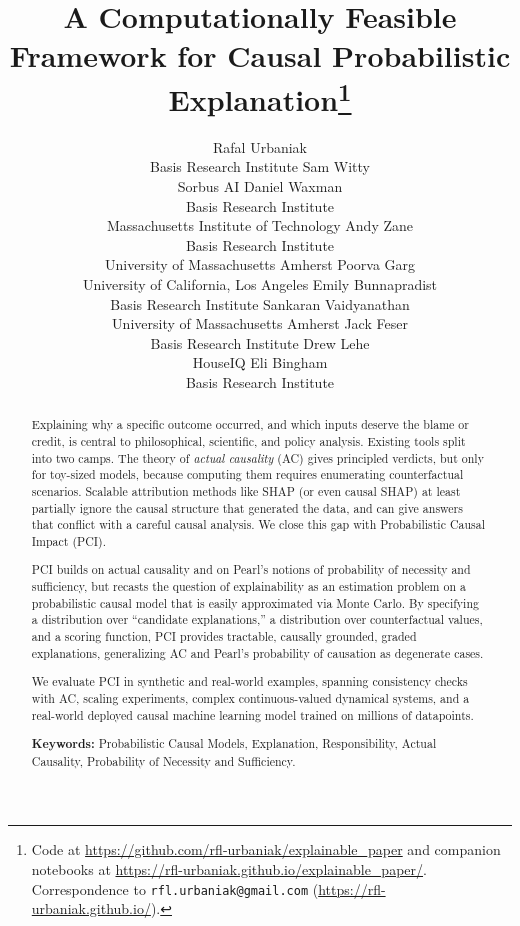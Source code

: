 \documentclass{article}
\title{A Computationally Feasible Framework for Causal Probabilistic Explanation\thanks{\raggedright Code at \url{https://github.com/rfl-urbaniak/explainable_paper} and companion notebooks at \url{https://rfl-urbaniak.github.io/explainable_paper/}. Correspondence to \texttt{rfl.urbaniak@gmail.com} (\url{https://rfl-urbaniak.github.io/}).}}
\author{%
  Rafal Urbaniak \\
  Basis Research Institute
  \And
  Sam Witty \\
  Sorbus AI
  \And
  Daniel Waxman \\
  Basis Research Institute \\
  Massachusetts Institute of Technology
  \And
  Andy Zane \\
  Basis Research Institute \\
  University of Massachusetts Amherst
  \And
  Poorva Garg \\
  University of California, Los Angeles
  \And
  Emily Bunnapradist \\
  Basis Research Institute
  \And
  Sankaran Vaidyanathan \\
  University of Massachusetts Amherst
  \And
  Jack Feser \\
  Basis Research Institute
  \And
  Drew Lehe \\
  HouseIQ
  \And
  Eli Bingham \\
  Basis Research Institute
}
\newcommand{\ourapproach}{PCI\xspace}
\newcommand{\Ourapproach}{PCI\xspace}
\begin{document}
\maketitle

\begin{abstract}%
  Explaining why a specific outcome occurred, and which inputs deserve the
  blame or credit, is central to philosophical, scientific, and policy analysis.
  Existing tools split into two camps. The theory of
  \emph{actual causality} (AC) gives principled verdicts, but only for toy-sized
  models, because computing them requires enumerating counterfactual scenarios.
  Scalable attribution methods like SHAP (or even causal SHAP) at least partially 
  ignore the causal structure that generated the data, and can give answers that conflict with a careful
  causal analysis. We close this gap with Probabilistic Causal Impact
  (\Ourapproach). 
  
  \ourapproach builds on actual causality and on Pearl's notions of probability
  of necessity and sufficiency, but recasts the question of explainability as an estimation problem on a probabilistic causal
  model that is easily approximated via Monte Carlo. By specifying a distribution over ``candidate explanations,'' a distribution over counterfactual values, and a scoring function, \ourapproach provides tractable, causally grounded, graded explanations, generalizing AC and Pearl's probability of causation as degenerate cases. 

  We evaluate \ourapproach in synthetic and real-world examples, spanning consistency checks with AC, scaling experiments, complex continuous-valued dynamical systems, and a real-world deployed causal machine learning model trained on millions of datapoints.

  \noindent\textbf{Keywords:} Probabilistic Causal Models, Explanation, Responsibility, Actual Causality, Probability of Necessity and Sufficiency.
\end{abstract}

\newpage
\begingroup
\renewcommand{\baselinestretch}{0.95}\small
\setlength{\parskip}{1pt}
\let\oldaddvspace\addvspace
\renewcommand{\addvspace}[1]{\oldaddvspace{0.4em}}
\setcounter{tocdepth}{2}
\tableofcontents
\let\addvspace\oldaddvspace
\endgroup
\newpage













\appendix








\end{document}

